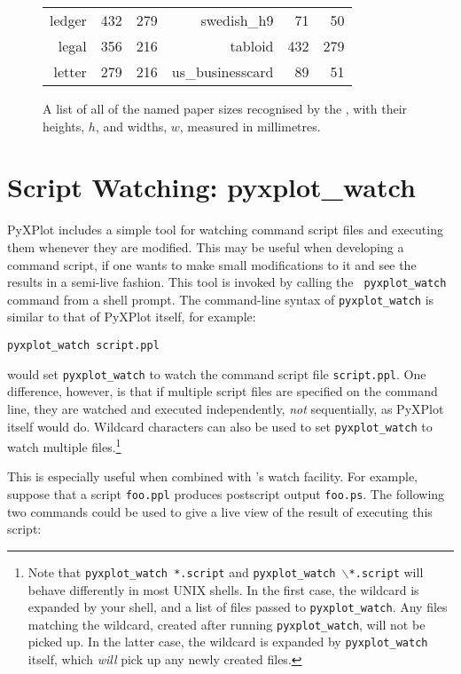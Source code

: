 \begin{figure}
\begin{tabular}{|rrr|rrr|}
                    ledger &    432 &    279 &       swedish\_h9 &     71 &     50 \\
                     legal &    356 &    216 &          tabloid &    432 &    279 \\
                    letter &    279 &    216 &  us\_businesscard &     89 &     51 \\
\hline
\end{tabular}
\caption{A list of all of the named paper sizes recognised by the , with their heights, $h$, and widths, $w$, measured in millimetres.}
\label{paper_sizes}
\end{figure}

\section{Script Watching: pyxplot\_watch}

PyXPlot includes a simple tool for watching command script files and executing
them whenever they are modified. This may be useful when developing a command
script, if one wants to make small modifications to it and see the results in a
semi-live fashion. This tool is invoked by calling the {\tt
pyxplot\_watch} command from a
shell prompt. The command-line syntax of {\tt pyxplot\_watch} is similar to
that of PyXPlot itself, for example:

\begin{verbatim}
pyxplot_watch script.ppl
\end{verbatim}

\noindent would set {\tt pyxplot\_watch} to watch the command script file
{\tt script.ppl}. One difference, however, is that if multiple script files are
specified on the command line, they are watched and executed independently,
\textit{not} sequentially, as PyXPlot itself would do. Wildcard characters can
also be used to set {\tt pyxplot\_watch} to watch multiple
files.\footnote{Note that {\tt pyxplot\_watch *.script} and
{\tt pyxplot\_watch $\backslash$*.script} will behave differently in most
UNIX shells.  In the first case, the wildcard is expanded by your shell, and a
list of files passed to {\tt pyxplot\_watch}. Any files matching the
wildcard, created after running {\tt pyxplot\_watch}, will not be picked up.
In the latter case, the wildcard is expanded by {\tt pyxplot\_watch} itself,
which {\it will} pick up any newly created files.}

This is especially useful when combined with \ghostview's
watch facility. For example, suppose that a script {\tt foo.ppl} produces
postscript output {\tt foo.ps}. The following two commands could be used to
give a live view of the result of executing this script:


